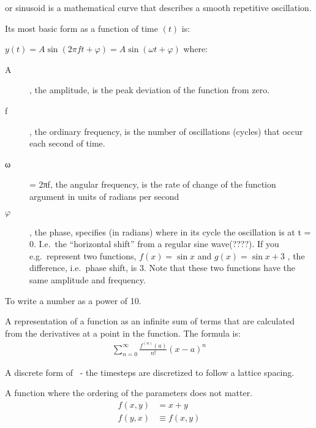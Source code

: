 \begin{definition}
or sinusoid is a mathematical curve that describes a smooth repetitive
oscillation.

Its most basic form as a function of time $(t)$ is:

$y(t) = A\sin(2 \pi f t + \varphi) = A\sin(\omega t + \varphi)$
where:
\begin{description}
    \item[A], the amplitude, is the peak deviation of the function from zero.
    \item[f], the ordinary frequency, is the number of oscillations (cycles)
        that occur each second of time.
    \item[ω] = 2πf, the angular frequency, is the rate of change of the
    function argument in units of radians per second 
    \item[$\varphi$], the phase, specifies (in radians) where in its cycle the
        oscillation is at t = 0. I.e.\ the ``horizontal shift'' from a regular
        sine wave(????).
    If you e.g.\ represent two functions, $f(x) = \sin{x}$ and $g(x) = \sin{x} + 3$
    , the difference, i.e.\ phase shift, is 3. Note that these two functions
    have the same amplitude and frequency.
\end{description}

\end{definition}

\begin{definition}
    To write a number as a power of 10.
\end{definition}

\begin{definition}
    A representation of a function as an infinite sum of terms that are 
    calculated from the derivatives at a point in the function.
    The formula is:
    \begin{align}
        \sum\limits_{n=0}^{\infty}{\frac{f^{(n)}(a)}{n!}{(x-a)}^{n}}
    \end{align}
\end{definition}

\begin{definition}
    A discrete form of~ - the timesteps are discretized to follow
    a lattice spacing.
\end{definition}

\begin{definition}
    A function where the ordering of the parameters does not matter.
    \begin{align}
        f(x,y) &= x + y \\
        f(y,x) &\equiv f(x,y)
    \end{align}
\end{definition}


